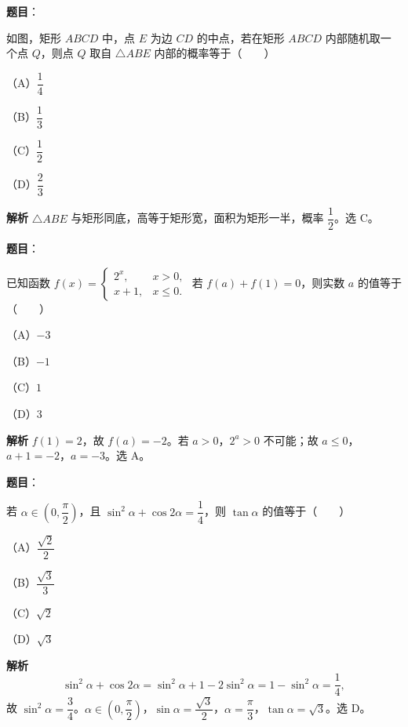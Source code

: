 \begin{answer}

\textbf{题目}：

如图，矩形 $ABCD$ 中，点 $E$ 为边 $CD$ 的中点，若在矩形 $ABCD$ 内部随机取一个点 $Q$，则点 $Q$ 取自 $\triangle ABE$ 内部的概率等于\mbox{（　　）}

（A）$\dfrac14$

（B）$\dfrac13$

（C）$\dfrac12$

（D）$\dfrac23$
\nopagebreak[4]
\begin{center}\end{center}
\nopagebreak[4]
\textbf{解析}
$\triangle ABE$ 与矩形同底，高等于矩形宽，面积为矩形一半，概率 $\dfrac12$。选 C。


\end{answer}
\begin{answer}

\textbf{题目}：

已知函数 $f(x)=\begin{cases}2^x,&x>0,\\x+1,&x\leqslant0.\end{cases}$ 若 $f(a)+f(1)=0$，则实数 $a$ 的值等于\mbox{（　　）}

（A）$-3$

（B）$-1$

（C）$1$

（D）$3$

\textbf{解析}
$f(1)=2$，故 $f(a)=-2$。若 $a>0$，$2^a>0$ 不可能；故 $a\leqslant0$，$a+1=-2$，$a=-3$。选 A。


\end{answer}
\begin{answer}

\textbf{题目}：

若 $\alpha\in\left(0,\dfrac\pi2\right)$，且 $\sin^2\alpha+\cos2\alpha=\dfrac14$，则 $\tan\alpha$ 的值等于\mbox{（　　）}

（A）$\dfrac{\sqrt2}2$

（B）$\dfrac{\sqrt3}3$

（C）$\sqrt2$

（D）$\sqrt3$

\textbf{解析}
\nopagebreak[4]
\[\sin^2\alpha+\cos2\alpha=\sin^2\alpha+1-2\sin^2\alpha=1-\sin^2\alpha=\frac14,\]
故 $\sin^2\alpha=\dfrac34$。$\alpha\in\left(0,\dfrac\pi2\right)$，$\sin\alpha=\dfrac{\sqrt3}2$，$\alpha=\dfrac\pi3$，$\tan\alpha=\sqrt3$。选 D。


\end{answer}
